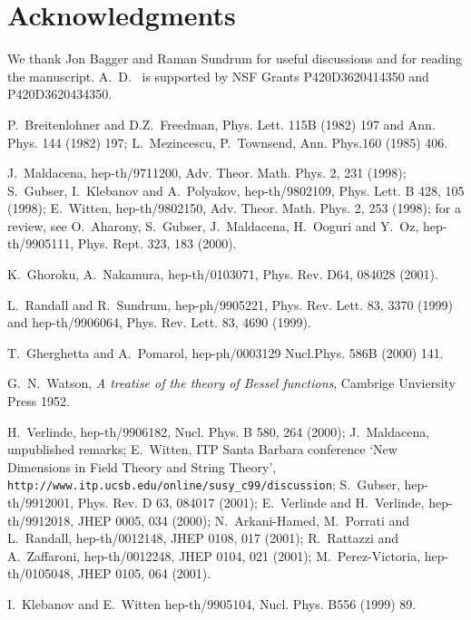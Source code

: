 \documentclass[a4paper,12pt,dvips]{article}
\begin{document}
\section*{Acknowledgments}
We thank Jon Bagger and Raman Sundrum for useful discussions and
for reading the manuscript. A.~D.~ is supported by NSF Grants
P420D3620414350 and P420D3620434350.

\begin{thebibliography}{99}
P.~Breitenlohner and D.Z.~Freedman, Phys. Lett.
115B (1982) 197 and Ann. Phys. 144 (1982) 197;
L.~Mezincescu, P.~Townsend, Ann. Phys.160 (1985) 406.

J.~Maldacena, hep-th/9711200,
Adv. Theor. Math. Phys. 2, 231 (1998);
S.~Gubser, I.~Klebanov and A.~Polyakov, hep-th/9802109, Phys. Lett. B
428, 105 (1998); E.~Witten, hep-th/9802150, Adv. Theor. Math. Phys. 2,
253 (1998); for a review, see O.~Aharony, S.~Gubser, J.~Maldacena,
H.~Ooguri and Y.~Oz, hep-th/9905111, Phys. Rept. 323, 183 (2000).

K.~Ghoroku, A.~Nakamura, hep-th/0103071, Phys.
Rev. D64, 084028 (2001).

L.~Randall and R.~Sundrum, hep-ph/9905221,
Phys. Rev. Lett. 83, 3370 (1999) and hep-th/9906064, Phys. Rev.
Lett. 83, 4690 (1999).

T.~Gherghetta and A.~Pomarol, hep-ph/0003129
Nucl.Phys. 586B (2000) 141.

G.~N.~Watson, \emph{A treatise of the theory of Bessel functions}, Cambrige
Unviersity Press 1952.

H.~Verlinde, hep-th/9906182, Nucl. Phys. B 580, 264 (2000);
J.~Maldacena, unpublished remarks;
E.~Witten, ITP Santa Barbara conference
`New Dimensions in Field Theory and String Theory',
{\tt http://www.itp.ucsb.edu/online/susy\_c99/discussion};
S.~Gubser, hep-th/9912001, Phys. Rev. D 63, 084017 (2001);
E.~Verlinde and H.~Verlinde,
hep-th/9912018, JHEP 0005, 034 (2000);
N.~Arkani-Hamed, M.~Porrati and L.~Randall,
hep-th/0012148, JHEP 0108, 017 (2001);
R.~Rattazzi and A.~Zaffaroni, hep-th/0012248,
JHEP 0104, 021 (2001); M.~Perez-Victoria,
hep-th/0105048, JHEP 0105, 064 (2001).

I.~Klebanov and E.~Witten hep-th/9905104, Nucl. Phys.
B556 (1999) 89.


\end{thebibliography}
\end{document}
